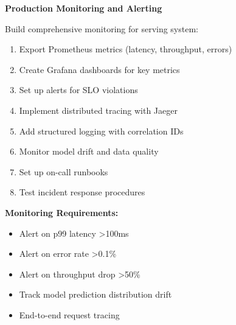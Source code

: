 \begin{exercise}
\textbf{Production Monitoring and Alerting}

Build comprehensive monitoring for serving system:

\begin{enumerate}
    \item Export Prometheus metrics (latency, throughput, errors)
    \item Create Grafana dashboards for key metrics
    \item Set up alerts for SLO violations
    \item Implement distributed tracing with Jaeger
    \item Add structured logging with correlation IDs
    \item Monitor model drift and data quality
    \item Set up on-call runbooks
    \item Test incident response procedures
\end{enumerate}

\textbf{Monitoring Requirements:}
\begin{itemize}
    \item Alert on p99 latency >100ms
    \item Alert on error rate >0.1\%
    \item Alert on throughput drop >50\%
    \item Track model prediction distribution drift
    \item End-to-end request tracing
\end{itemize}
\end{exercise}
